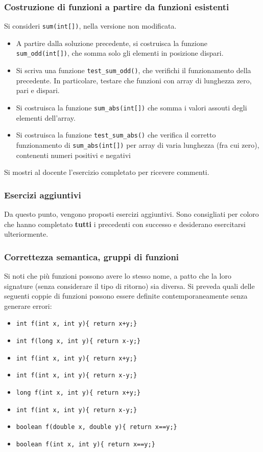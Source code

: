 \documentclass{beamer}
\begin{document}
\begin{frame}[fragile]
\frametitle{Costruzione di funzioni a partire da funzioni esistenti}
Si consideri \texttt{sum(int[])}, nella versione non modificata.
\begin{itemize}
 \item A partire dalla soluzione precedente, si costruisca la funzione \texttt{sum\_odd(int[])}, che somma solo gli elementi in posizione dispari.
 \item Si scriva una funzione \texttt{test\_sum\_odd()}, che verifichi il funzionamento della precedente. In particolare, testare che funzioni con array di lunghezza zero, pari e dispari.
 \item Si costruisca la funzione \texttt{sum\_abs(int[])} che somma i valori assouti degli elementi dell'array.
 \item Si costruisca la funzione \texttt{test\_sum\_abs()} che verifica il corretto funzionamento di \texttt{sum\_abs(int[])} per array di varia lunghezza (fra cui zero), contenenti numeri positivi e negativi
\end{itemize}
Si mostri al docente l'esercizio completato per ricevere commenti.
\end{frame}

\begin{frame}[fragile]
\frametitle{Esercizi aggiuntivi}
Da questo punto, vengono proposti esercizi aggiuntivi. Sono consigliati per coloro che hanno completato \textbf{tutti} i precedenti con successo e desiderano esercitarsi ulteriormente.
\end{frame}

\begin{frame}
\frametitle{Correttezza semantica, gruppi di funzioni}
Si noti che più funzioni possono avere lo stesso nome, a patto che la loro signature (senza considerare il tipo di ritorno) sia diversa. Si preveda quali delle seguenti coppie di funzioni possono essere definite contemporaneamente senza generare errori:
\begin{itemize}
 \item \texttt{int f(int x, int y)\{ return x+y;\}}
 \item \texttt{int f(long x, int y)\{ return x-y;\}}
\end{itemize}
\begin{itemize}
 \item \texttt{int f(int x, int y)\{ return x+y;\}}
 \item \texttt{int f(int x, int y)\{ return x-y;\}}
\end{itemize}
\begin{itemize}
 \item \texttt{long f(int x, int y)\{ return x+y;\}}
 \item \texttt{int f(int x, int y)\{ return x-y;\}}
\end{itemize}
\begin{itemize}
 \item \texttt{boolean f(double x, double y)\{ return x==y;\}}
 \item \texttt{boolean f(int x, int y)\{ return x==y;\}}
\end{itemize}
\end{frame}
\end{document}

